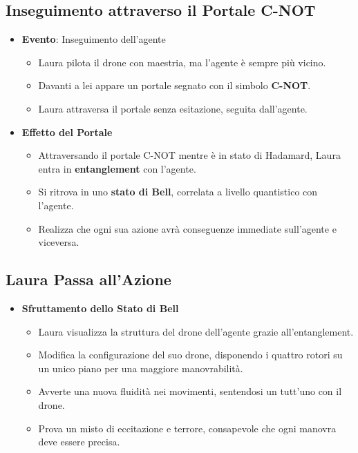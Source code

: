 \subsection*{Inseguimento attraverso il Portale C-NOT}

\begin{itemize}
    \item \textbf{Evento}: Inseguimento dell'agente
    \begin{itemize}
        \item Laura pilota il drone con maestria, ma l'agente è sempre più vicino.
        \item Davanti a lei appare un portale segnato con il simbolo \textbf{C-NOT}.
        \item Laura attraversa il portale senza esitazione, seguita dall'agente.
    \end{itemize}
    \item \textbf{Effetto del Portale}
    \begin{itemize}
        \item Attraversando il portale C-NOT mentre è in stato di Hadamard, Laura entra in \textbf{entanglement} con l'agente.
        \item Si ritrova in uno \textbf{stato di Bell}, correlata a livello quantistico con l'agente.
        \item Realizza che ogni sua azione avrà conseguenze immediate sull'agente e viceversa.
    \end{itemize}
\end{itemize}

\subsection*{Laura Passa all'Azione}

\begin{itemize}
    \item \textbf{Sfruttamento dello Stato di Bell}
    \begin{itemize}
        \item Laura visualizza la struttura del drone dell'agente grazie all'entanglement.
        \item Modifica la configurazione del suo drone, disponendo i quattro rotori su un unico piano per una maggiore manovrabilità.
        \item Avverte una nuova fluidità nei movimenti, sentendosi un tutt'uno con il drone.
        \item Prova un misto di eccitazione e terrore, consapevole che ogni manovra deve essere precisa.
    \end{itemize}
\end{itemize}

